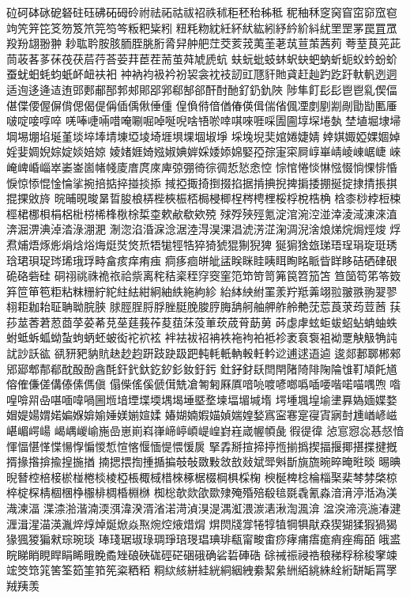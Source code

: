 砬砢砵砯砨砮砫砡砩砳砪砱祔祛祏祜祓祒祑秫秬秠秮秭秪
秜秞秝窆窉窅窋窌窊窇竘笐笄笓笅笏笈笊笎笉笒粄粑粊粌
粈粍粅紞紝紑紎紘紖紓紟紒紏紌罜罡罞罠罝罛羖羒翃翂翀
耖耾耹胺胲胹胵脁胻脀舁舯舥茳茭荄茙荑茥荖茿荁茦茜茢
荂荎茛茪茈茼荍茖茤茠茷茯茩荇荅荌荓茞茬荋茧荈虓虒蚢
蚨蚖蚍蚑蚞蚇蚗蚆蚋蚚蚅蚥蚙蚡蚧蚕蚘蚎蚝蚐蚔衃衄衭衵
衶衲袀衱衿衯袃衾衴衼訒豇豗豻貤貣赶赸趵趷趶軑軓迾迵
适迿迻逄迼迶郖郠郙郚郣郟郥郘郛郗郜郤酐酎酏釕釢釚陜
陟隼飣⾽髟⾿鬯乿偰偪偡偞偠偓偋偝偲偈偍偁偛偊偢倕偅
偟偩偫偣偤偆偀偮偳偗偑凐剫剭剬剮勖勓匭厜啵啶唼啍啐
唴唪啑啢唶唵唰啒啅唌唲啥啎唹啈唭唻啀啋圊圇埻堔埢埶
埜埴堀埭埽堈埸堋埳埏堇埮埣埲埥埬埡堎埼堐埧堁堌埱埩
埰堍堄奜婠婘婕婧婞娸娵婭婐婟婥婬婓婤婗婃婝婒婄婛
婈媎娾婍娹婌婰婩婇婑婖婂婜孲孮寁寀屙崞崋崝崚崠崌崨
崍崦崥崏崰崒崣崟崮帾帴庱庴庹庲庳弶弸徛徖徟悊悐悆悾
悰悺惓惔惏惤惙惝惈悱惛悷惊悿惃惍惀挲捥掊掂捽掽掞掭
掝掗掫掎捯掇掐据掯捵掜捭掮捼掤挻掟捸掅掁掑掍捰敓旍
晥晡晛晙晜晢朘桹梇梐梜桭桮梮梫楖桯梣梬梩桵桴梲梏桷
梒桼桫桲梪梀桱桾梛梖梋梠梉梤桸桻梑梌梊桽欶欳欷欸殑
殏殍殎殌氪淀涫涴涳湴涬淩淢涷淶淔渀淈淠淟淖涾淥淜淝
淛淴淊涽淭淰涺淕淂淏淉淐淲淓淽淗淍淣涻烺焍烷焗烴焌
烰焄烳焐烼烿焆焓焀烸烶焋焂焎牾牻牼牿猝猗猇猑猘猊猈
狿猏猞玈珶珸珵琄琁珽琇琀珺珼珿琌琋珴琈畤畣痎痒痏痋
痌痑痐皏皉盓眹眯眭眱眲眴眳眽眥眻眵硈硒硉硍硊硌砦硅
硐祤祧祩祪祣祫祡离秺秸秶秷窏窔窐笵笻笴笥笰笢笤笳笘
笪笝笱笫笭笯笲笸笚笣粔粘粖粣紵紽紸紶紺絅紬紩絁絇紾
紿絊紻紨罣羕羜羝羛翊翋翍翐翑翇翏翉耟耞耛聇聃聈脘脥
脙脛脭脟脬脞脡脕脧脝脢舑舸舳舺舴舲艴莐莣莨莍荺荳莤
荴莏莁莕莙荵莔莩荽莃莌莝莛莪莋荾莥莯莈莗莰荿莦莇莮
荶虙虖蚿蚷蛂蛁蛅蚺蚰蛈蚹蚳蚸蛌蚴蚻蚼蛃蚽蚾衒袉袕袨
袢袪袚袑袡袟袘袧袙袛袗袤袬袌袓袎覂觖觙觕訰訧訬訞谹
谻豜豝豽貥赽赻赹趼跂趹趿跁軘軞軝軜軗軠軡逤逋逑逜逌
逡郯郪郰郴郲郳郔郫郬郩酖酘酚酓酕釬釴釱釳釸釤釹釪釫
釷釨釮镺閆閈陼陭陫陱陯隿靪頄飥馗傛傕傔傞傋傣傃傌傎
傝偨傜傒傂傇兟凔匒匑厤厧喑喨喥喭啷噅喢喓喈喏喵喁喣
喒喤啽喌喦啿喕喡喎圌堩堷堙堞堧堣堨埵塈堥堜堛堳堿堶
堮堹堸堭堬堻奡媯媔媟婺媢媞婸媦婼媥媬媕媮娷媄媊媗媃
媋媩婻婽媌媜媏媓媝寪寍寋寔寑寊寎尌尰崷嵃嵫嵁嵋崿崵
嵑嵎嵕崳崺嵒崽崱嵙嵂崹嵉崸崼崲崶嵀嵅幄幁彘徦徥徫
惉悹惌惢惎惄愔惲愊愖愅惵愓惸惼惾惁愃愘愝愐惿愄愋扊
掔掱掰揎揥揨揯揃撝揳揊揠揶揕揲揵摡揟掾揝揜揄揘揓揂
揇揌揋揈揰揗揙攲敧敪敤敜敨敥斌斝斞斮旐旒晼晬晻暀晱
晹晪晲朁椌棓椄棜椪棬棪棱椏棖棷棫棤棶椓椐棳棡椇棌椈
楰梴椑棯棆椔棸棐棽棼棨椋椊椗棎棈棝棞棦棴棑椆棔棩椕
椥棇欹欻欿欼殔殗殙殕殽毰毲毳氰淼湆湇渟湉溈渼渽湅湢
渫渿湁湝湳渜渳湋湀湑渻渃渮湞湨湜湡渱渨湠湱湫渹渢渰
湓湥渧湸湤湷湕湹湒湦渵渶湚焠焞焯烻焮焱焣焥焢焲焟焨
焺焛牋牚犈犉犆犅犋猒猋猰猢猱猳猧猲猭猦猣猵猌琮琬琰
琫琖琚琡琭琱琤琣琝琩琠琲瓻甯畯畬痧痚痡痦痝痟痤痗皕
皒盚睆睇睄睍睅睊睎睋睌矞矬硠硤硥硜硭硱硪确硰硩硨硞
硢祴祳祲祰稂稊稃稌稄窙竦竤筊筇筄筈筌筎筀筘筅粢粞粨
粡絘絯絣絓絖絧絪絏絭絜絫絒絔絩絑絟絎缾缿罥罦羢羠羡

